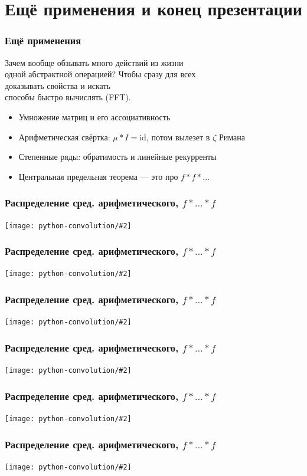 \documentclass[11pt,aspectratio=169,svgnames]{beamer}
\newcommand{\graslide}[2]{
   \begin{frame} \frametitle{#1}
      \texttt{[image: python-convolution/\#2]}
   \end{frame}
}
\newcommand{\probtitle}{Распределение сред. арифметического, \(f * \ldots * f\)}
\begin{document}
\section{Ещё применения и конец презентации}

\begin{frame} \frametitle{Ещё применения}
	Зачем вообще обзывать много действий из жизни \\
	одной абстрактной операцией? Чтобы сразу для всех \\
	доказывать свойства и искать \\
	способы быстро вычислять (FFT). \bigskip

\begin{itemize}
	\item Умножение матриц и его ассоциативность
	\item Арифметическая свёртка: \(μ * I = \text{id}\), потом вылезет в \(ζ\) Римана
	\item Степенные ряды: обратимость и линейные рекурренты
	\item Центральная предельная теорема — это про \(f * f * \ldots\)
\end{itemize}
\end{frame}

\graslide{\probtitle}{probability-0}
\graslide{\probtitle}{probability-1}
\graslide{\probtitle}{probability-2}
\graslide{\probtitle}{probability-3}
\graslide{\probtitle}{probability-4}
\graslide{\probtitle}{probability-5}
\end{document}
